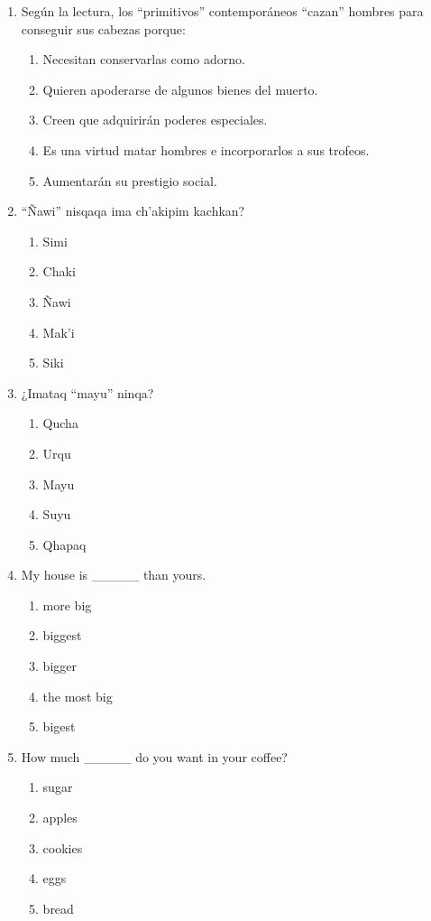 \begin{enumerate}
	\item Según la lectura, los “primitivos” contemporáneos “cazan” hombres para conseguir sus cabezas porque:
	\begin{enumerate}[label=\alph*)]
		\item Necesitan conservarlas como adorno.
		\item Quieren apoderarse de algunos bienes del muerto.
		\item Creen que adquirirán poderes especiales.
		\item Es una virtud matar hombres e incorporarlos a sus trofeos.
		\item Aumentarán su prestigio social.
	\end{enumerate}
	
	\item “Ñawi” nisqaqa ima ch’akipim kachkan?
	\begin{enumerate}[label=\alph*)]
		\item Simi
		\item Chaki
		\item Ñawi
		\item Mak’i
		\item Siki
	\end{enumerate}
	
	\item ¿Imataq “mayu” ninqa?
	\begin{enumerate}[label=\alph*)]
		\item Qucha
		\item Urqu
		\item Mayu
		\item Suyu
		\item Qhapaq
	\end{enumerate}
	

	
	\item My house is \_\_\_\_\_ than yours.
	\begin{enumerate}[label=\alph*)]
		\item more big
		\item biggest
		\item bigger
		\item the most big
		\item bigest
	\end{enumerate}
	
	\item How much \_\_\_\_\_ do you want in your coffee?
	\begin{enumerate}[label=\alph*)]
		\item sugar
		\item apples
		\item cookies
		\item eggs
		\item bread
	\end{enumerate}
	
\end{enumerate}


